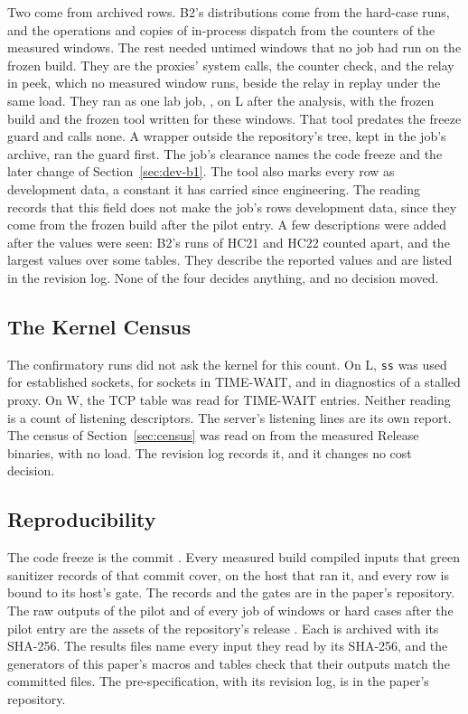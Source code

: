 Two come from archived rows. B2's distributions come from the hard-case runs, and the operations
and copies of in-process dispatch from the counters of the measured windows. The rest needed
untimed windows that no job had run on the frozen build. They are the proxies' system calls, the
counter check, and the relay in peek, which no measured window runs, beside the relay in replay
under the same load. They ran as one lab job, \JobSt, on L after the analysis, with the frozen build and the
frozen tool written for these windows. That tool predates
the freeze guard and calls none. A wrapper outside the repository's tree, kept in the job's
archive, ran the guard first. The job's clearance names the code freeze and the later change of
Section~\ref{sec:dev-b1}. The tool
also marks every row as development data, a constant it has carried since engineering. The reading
records that this field does not make the job's rows development data, since they come from the
frozen build after the pilot entry. A few descriptions were added after the values were seen: B2's
runs of HC21 and HC22 counted apart, and the largest values over some tables. They describe the
reported values and are listed in the revision log. None of the four decides anything, and no
decision moved.

\subsection{The Kernel Census}\label{sec:dev-census}

The confirmatory runs did not ask the kernel for this count. On L, \texttt{ss} was used for
established sockets, for sockets in TIME-WAIT, and in diagnostics of a stalled proxy. On W, the TCP
table was read for TIME-WAIT entries. Neither reading is a count of listening descriptors. The
server's listening lines are its own report. The census of Section~\ref{sec:census} was read on
\CensusDate{} from the measured Release binaries, with no load. The revision log records it, and it
changes no cost decision.

\subsection{Reproducibility}\label{sec:dev-repro}

The code freeze is the commit \hex{\CodeFreeze}. Every measured build compiled inputs that green
sanitizer records of that commit cover, on the host that ran it, and every row is bound to its
host's gate. The records and the gates are in the paper's repository. The raw outputs of the pilot
and of every job of windows or hard cases after the pilot entry are the assets of the repository's
release \DataRelease. Each is archived with its SHA-256. The results files name every input they
read by its SHA-256, and the generators of this paper's macros and tables check that
their outputs match the committed files. The pre-specification, with its revision log, is in the
paper's repository.
